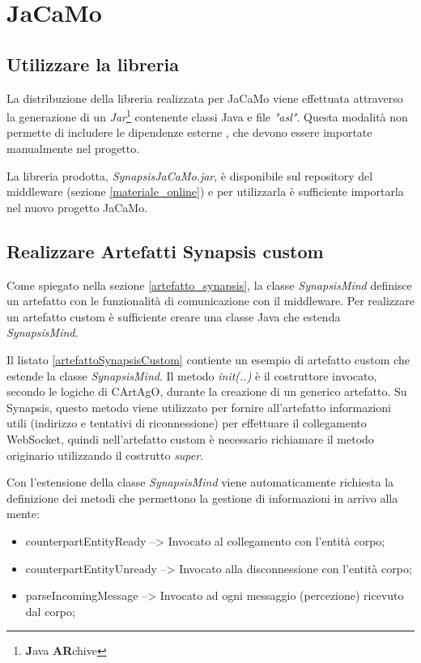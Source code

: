 \chapter{JaCaMo} \label{appendice_JaCamo}

\section{Utilizzare la libreria}

La distribuzione della libreria realizzata per JaCaMo viene effettuata attraverso la generazione di un \textit{Jar}\footnote{\textbf{J}ava \textbf{AR}chive} contenente classi Java e file \textit{"asl"}. Questa modalità non permette di includere le dipendenze esterne \cite{gson}\cite{tyrus}, che devono essere importate manualmente nel progetto. 

\medskip

La libreria prodotta, \textit{SynapsisJaCaMo.jar}, è disponibile sul repository del middleware (sezione \ref{materiale_online}) e per utilizzarla è sufficiente importarla nel nuovo progetto JaCaMo.

\section{Realizzare Artefatti Synapsis custom} \label{artefatto_custom}

Come spiegato nella sezione \ref{artefatto_synapsis}, la classe \textit{SynapsisMind} definisce un artefatto con le funzionalità di comunicazione con il middleware. Per realizzare un artefatto custom è sufficiente creare una classe Java che estenda \textit{SynapsisMind}.



Il listato \ref{artefattoSynapsisCustom} contiente un esempio di artefatto custom che estende la classe \textit{SynapsisMind}. Il metodo \textit{init(..)} è il costruttore invocato, secondo le logiche di CArtAgO, durante la creazione di un generico artefatto. Su Synapsis, questo metodo viene utilizzato per fornire all'artefatto informazioni utili (indirizzo e tentativi di riconnessione) per effettuare il collegamento WebSocket, quindi nell'artefatto custom è necessario richiamare il metodo originario utilizzando il costrutto \textit{super}.

\medskip

Con l'estensione della classe \textit{SynapsisMind} viene automaticamente richiesta la definizione dei metodi che permettono la gestione di informazioni in arrivo alla mente:
\begin{itemize}
    \item counterpartEntityReady --> Invocato al collegamento con l'entità corpo;
    \item counterpartEntityUnready --> Invocato alla disconnessione con l'entità corpo;
    \item parseIncomingMessage --> Invocato ad ogni messaggio (percezione) ricevuto dal corpo;
\end{itemize}

